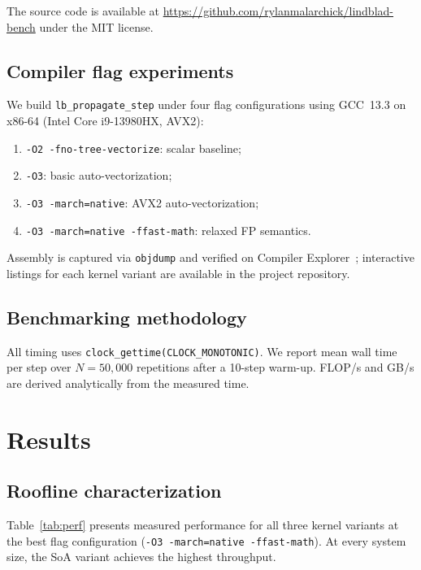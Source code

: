 \documentclass[final,3p,times,twocolumn]{elsarticle}
\begin{document}
The source code is available at
\url{https://github.com/rylanmalarchick/lindblad-bench} under the MIT
license.

\subsection{Compiler flag experiments}
\label{sec:flags}

We build \texttt{lb\_propagate\_step} under four flag configurations using
GCC~13.3 on x86-64 (Intel Core i9-13980HX, AVX2):
\begin{enumerate}
  \item \texttt{-O2 -fno-tree-vectorize}: scalar baseline;
  \item \texttt{-O3}: basic auto-vectorization;
  \item \texttt{-O3 -march=native}: AVX2 auto-vectorization;
  \item \texttt{-O3 -march=native -ffast-math}: relaxed FP semantics.
\end{enumerate}
Assembly is captured via \texttt{objdump} and verified on Compiler
Explorer~\cite{Godbolt}; interactive listings for each kernel variant
are available in the project repository.

\subsection{Benchmarking methodology}
\label{sec:bench}

All timing uses \texttt{clock\_gettime(CLOCK\_MONO\-TONIC)}.
We report mean wall time per step over $N = 50{,}000$ repetitions after a
10-step warm-up. FLOP/s and GB/s are derived analytically from the measured
time.

\section{Results}
\label{sec:results}

\subsection{Roofline characterization}
\label{sec:roofline_results}

Table~\ref{tab:perf} presents measured performance for all three kernel
variants at the best flag configuration (\texttt{-O3 -march=native
-ffast-math}). At every system size, the SoA variant achieves the highest
throughput.
\end{document}
